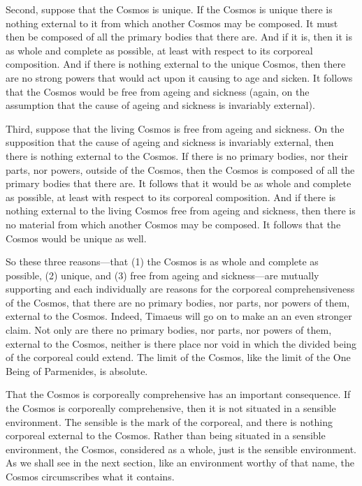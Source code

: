 Second, suppose that the Cosmos is unique. If the Cosmos is unique there is nothing external to it from which another Cosmos may be composed. It must then be composed of all the primary bodies that there are. And if it is, then it is as whole and complete as possible, at least with respect to its corporeal composition. And if there is nothing external to the unique Cosmos, then there are no strong powers that would act upon it causing to age and sicken. It follows that the Cosmos would be free from ageing and sickness (again, on the assumption that the cause of ageing and sickness is invariably external).

Third, suppose that the living Cosmos is free from ageing and sickness. On the supposition that the cause of ageing and sickness is invariably external, then there is nothing external to the Cosmos. If there is no primary bodies, nor their parts, nor powers, outside of the Cosmos, then the Cosmos is composed of all the primary bodies that there are. It follows that it would be as whole and complete as possible, at least with respect to its corporeal composition. And if there is nothing external to the living Cosmos free from ageing and sickness, then there is no material from which another Cosmos may be composed. It follows that the Cosmos would be unique as well.

So these three reasons---that (1) the Cosmos is as whole and complete as possible, (2) unique, and (3) free from ageing and sickness---are mutually supporting and each individually are reasons for the corporeal comprehensiveness of the Cosmos, that there are no primary bodies, nor parts, nor powers of them, external to the Cosmos. Indeed, Timaeus will go on to make an an even stronger claim. Not only are there no primary bodies, nor parts, nor powers of them, external to the Cosmos, neither is there place nor void in which the divided being of the corporeal could extend. The limit of the Cosmos, like the limit of the One Being of Parmenides, is absolute.

That the Cosmos is corporeally comprehensive has an important consequence. If the Cosmos is corporeally comprehensive, then it is not situated in a sensible environment. The sensible is the mark of the corporeal, and there is nothing corporeal external to the Cosmos. Rather than being situated in a sensible environment, the Cosmos, considered as a whole, just is the sensible environment. As we shall see in the next section, like an environment worthy of that name, the Cosmos circumscribes what it contains.

